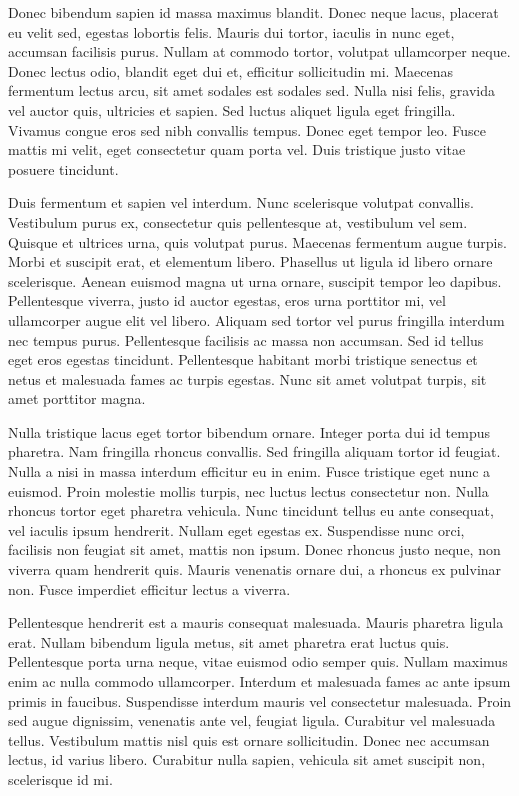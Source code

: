 Donec bibendum sapien id massa maximus blandit. Donec neque lacus, placerat eu velit sed, egestas lobortis felis. Mauris dui tortor, iaculis in nunc eget, accumsan facilisis purus. Nullam at commodo tortor, volutpat ullamcorper neque. Donec lectus odio, blandit eget dui et, efficitur sollicitudin mi. Maecenas fermentum lectus arcu, sit amet sodales est sodales sed. Nulla nisi felis, gravida vel auctor quis, ultricies et sapien. Sed luctus aliquet ligula eget fringilla. Vivamus congue eros sed nibh convallis tempus. Donec eget tempor leo. Fusce mattis mi velit, eget consectetur quam porta vel. Duis tristique justo vitae posuere tincidunt.

Duis fermentum et sapien vel interdum. Nunc scelerisque volutpat convallis. Vestibulum purus ex, consectetur quis pellentesque at, vestibulum vel sem. Quisque et ultrices urna, quis volutpat purus. Maecenas fermentum augue turpis. Morbi et suscipit erat, et elementum libero. Phasellus ut ligula id libero ornare scelerisque. Aenean euismod magna ut urna ornare, suscipit tempor leo dapibus. Pellentesque viverra, justo id auctor egestas, eros urna porttitor mi, vel ullamcorper augue elit vel libero. Aliquam sed tortor vel purus fringilla interdum nec tempus purus. Pellentesque facilisis ac massa non accumsan. Sed id tellus eget eros egestas tincidunt. Pellentesque habitant morbi tristique senectus et netus et malesuada fames ac turpis egestas. Nunc sit amet volutpat turpis, sit amet porttitor magna.

Nulla tristique lacus eget tortor bibendum ornare. Integer porta dui id tempus pharetra. Nam fringilla rhoncus convallis. Sed fringilla aliquam tortor id feugiat. Nulla a nisi in massa interdum efficitur eu in enim. Fusce tristique eget nunc a euismod. Proin molestie mollis turpis, nec luctus lectus consectetur non. Nulla rhoncus tortor eget pharetra vehicula. Nunc tincidunt tellus eu ante consequat, vel iaculis ipsum hendrerit. Nullam eget egestas ex. Suspendisse nunc orci, facilisis non feugiat sit amet, mattis non ipsum. Donec rhoncus justo neque, non viverra quam hendrerit quis. Mauris venenatis ornare dui, a rhoncus ex pulvinar non. Fusce imperdiet efficitur lectus a viverra.

Pellentesque hendrerit est a mauris consequat malesuada. Mauris pharetra ligula erat. Nullam bibendum ligula metus, sit amet pharetra erat luctus quis. Pellentesque porta urna neque, vitae euismod odio semper quis. Nullam maximus enim ac nulla commodo ullamcorper. Interdum et malesuada fames ac ante ipsum primis in faucibus. Suspendisse interdum mauris vel consectetur malesuada. Proin sed augue dignissim, venenatis ante vel, feugiat ligula. Curabitur vel malesuada tellus. Vestibulum mattis nisl quis est ornare sollicitudin. Donec nec accumsan lectus, id varius libero. Curabitur nulla sapien, vehicula sit amet suscipit non, scelerisque id mi.


